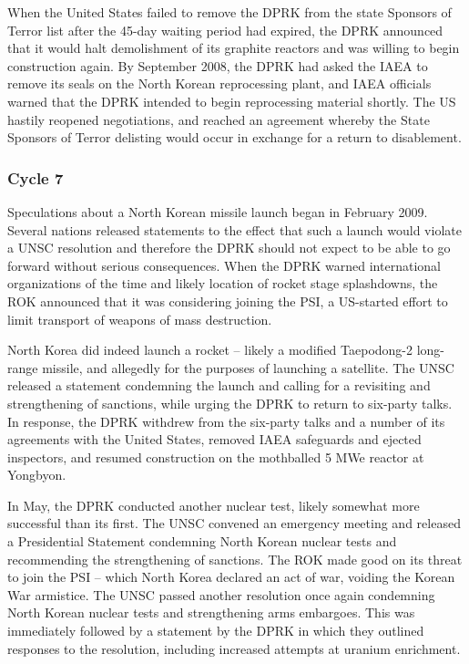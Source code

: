 \documentclass{article}
\begin{document}
When the United States failed to remove the DPRK from the state Sponsors of Terror list after the 45-day waiting period had expired, the DPRK announced that it would halt demolishment of its graphite reactors and was willing to begin construction again\cite{davenport}. By September 2008, the DPRK had asked the IAEA to remove its seals on the North Korean reprocessing plant, and IAEA officials warned that the DPRK intended to begin reprocessing material shortly\cite{iaea09}. The US hastily reopened negotiations, and reached an agreement whereby the State Sponsors of Terror delisting would occur in exchange for a return to disablement\cite{nti15}.

\subsubsection{Cycle 7}

Speculations about a North Korean missile launch began in February 2009. Several nations released statements to the effect that such a launch would violate a UNSC resolution and therefore the DPRK should not expect to be able to go forward without serious consequences\cite{davenport}. When the DPRK warned international organizations of the time and likely location of rocket stage splashdowns, the ROK announced that it was considering joining the PSI, a US-started effort to limit transport of weapons of mass destruction\cite{davenport}.

North Korea did indeed launch a rocket – likely a modified Taepodong-2 long-range missile, and allegedly for the purposes of launching a satellite\cite{davenport}. The UNSC released a statement condemning the launch and calling for a revisiting and strengthening of sanctions, while urging the DPRK to return to six-party talks\cite{unsc09}. In response, the DPRK withdrew from the six-party talks and a number of its agreements with the United States\cite{niksch}, removed IAEA safeguards and ejected inspectors\cite{iaea09}, and resumed construction on the mothballed 5 MWe reactor at Yongbyon\cite{nti15}.

In May, the DPRK conducted another nuclear test, likely somewhat more successful than its first\cite{nti15}. The UNSC convened an emergency meeting and released a Presidential Statement condemning North Korean nuclear tests and recommending the strengthening of sanctions\cite{unsc09p}. The ROK made good on its threat to join the PSI – which North Korea declared an act of war, voiding the Korean War armistice\cite{glionna}. The UNSC passed another resolution once again condemning North Korean nuclear tests and strengthening arms embargoes\cite{unsc09j}. This was immediately followed by a statement by the DPRK in which they outlined responses to the resolution, including increased attempts at uranium enrichment\cite{nti15}.
\end{document}
